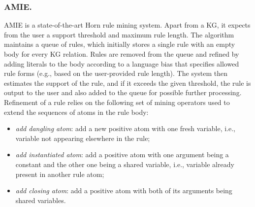 \subsubsection{AMIE.}
AMIE \cite{amie} is a state-of-the-art Horn rule mining system.
Apart from a KG, it expects from the user a support threshold and maximum
rule length. The algorithm maintains a queue of rules, which initially stores a single rule with an empty body for every KG relation. 
Rules are removed from the queue and refined by adding literals to the body according to a language bias that specifies allowed rule forms (e.g., based on the user-provided rule length). The system then estimates the support of the rule, and if it exceeds the given threshold, the rule is output to the user and also added to the queue for
possible further processing.
Refinement of a rule relies on the following set of mining operators used to extend the sequences of atoms in the rule body:
\begin{itemize}
\item \textit{add dangling atom}: add a new positive atom with one fresh variable, i.e., variable not appearing elsewhere in the rule;
\item \textit{add instantiated atom}: add a positive atom with one argument being a constant and the other one being a shared variable, i.e., variable already present in another rule atom;
\item \textit{add closing atom}:  add a positive atom with both of its arguments being shared variables.

\end{itemize}
